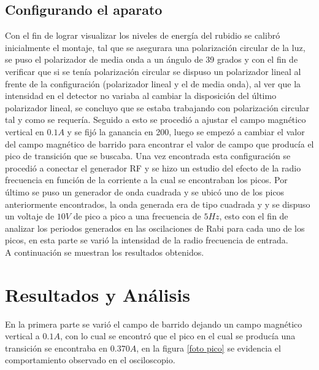 \documentclass[%
 reprint,
 amsmath,amssymb,
 aps,
]{revtex4-1}
\begin{document}
\subsection{Configurando el aparato}
Con el fin de lograr visualizar los niveles de energía del rubidio se calibró inicialmente el montaje, tal que se asegurara una polarización circular de la luz, se puso el polarizador de media onda a un ángulo de 39 grados y con el fin de verificar que si se tenía polarización circular se dispuso un polarizador lineal al frente de la configuración (polarizador lineal y el de media onda), al ver que la intensidad en el detector no variaba al cambiar la disposición del último polarizador lineal, se concluyo que se estaba trabajando con polarización circular tal y como se requería. Seguido a esto se procedió a ajustar el campo magnético vertical en $0.1A$ y se fijó la ganancia en 200, luego se empezó a cambiar el valor del campo magnético de barrido para encontrar el valor de campo que producía el pico de transición que se buscaba. Una vez encontrada esta configuración se procedió a conectar el generador RF y se hizo un estudio del efecto de la radio frecuencia en función de la corriente a la cual se encontraban los picos. Por último se puso un generador de onda cuadrada y se ubicó uno de los picos anteriormente encontrados, la onda generada era de tipo cuadrada y y se dispuso un voltaje de $10V$ de pico a pico a una frecuencia de $5Hz$, esto con el fin de analizar los periodos generados en las oscilaciones de Rabi para cada uno de los picos, en esta parte se varió la intensidad de la radio frecuencia de entrada.\\
A continuación se muestran los resultados obtenidos.


\section{Resultados y Análisis}
En la primera parte se varió el campo de barrido dejando un campo magnético vertical a $0.1 A$, con lo cual se encontró que el pico en el cual se producía una transición se encontraba en $0.370A$, en la figura \ref{foto pico} se evidencia el comportamiento observado en el osciloscopio.
\end{document}
